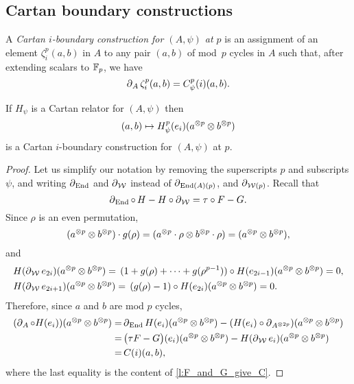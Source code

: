 \subsection{Cartan boundary constructions}\label{ss:cartan_coboundary}

A \textit{Cartan $i$-boundary construction for $(A,\psi)$ at $p$} is an assignment of an element $\zeta_i^p(a,b)$ in $A$ to any pair $(a,b)$ of mod~$p$ cycles in $A$ such that, after extending scalars to ${\mathbb{F}_p}$, we have
\[
\operatorname{\partial}_A \zeta_i^p(a,b) = C_\psi^p(i)(a, b).
\]

\begin{theorem}
	If $H_\psi$ is a Cartan relator for $(A, \psi)$ then
	\[
	(a,b) \mapsto H_\psi^p(e_i)(a^{\otimes p} \otimes b^{\otimes p})
	\]
	is a Cartan $i$-boundary construction for $(A, \psi)$ at $p$.
\end{theorem}

\begin{proof}
	Let us simplify our notation by removing the superscripts $p$ and subscripts $\psi$, and writing $\operatorname{\partial}_{\mathrm{End}}$ and $\operatorname{\partial}_{\mathcal{W}}$ instead of $\operatorname{\partial}_{\mathrm{End}(A)(p)}$, and $\operatorname{\partial}_{\mathcal{W}(p)}$.
	Recall that
	\[
	\operatorname{\partial}_{\mathrm{End}} \mathbin{\circ}\, H - H \mathbin{\circ} \operatorname{\partial}_{\mathcal{W}} = \tau \mathbin{\circ} F - G.
	\]
	Since $\rho$ is an even permutation,
	\[
	(a^{\otimes p} \otimes b^{\otimes p}) \cdot g(\rho) = (a^{\otimes p} \cdot \rho \otimes b^{\otimes p} \cdot \rho ) = (a^{\otimes p} \otimes b^{\otimes p}),
	\]
	and
	\begin{align*}
		&H(\operatorname{\partial}_{\mathcal{W}} e_{2i})(a^{\otimes p} \otimes b^{\otimes p}) =\,
		(1+g(\rho)+\dots+g(\rho^{p-1})) \mathbin{\circ} H(e_{2i-1})(a^{\otimes p} \otimes b^{\otimes p}) = 0, \\
		&H(\operatorname{\partial}_{\mathcal{W}} e_{2i+1})(a^{\otimes p} \otimes b^{\otimes p}) =\,
		(g(\rho) - 1) \mathbin{\circ} H(e_{2i})(a^{\otimes p} \otimes b^{\otimes p}) = 0.
	\end{align*}
	Therefore, since $a$ and $b$ are mod $p$ cycles,
	\begin{align*}
		(\operatorname{\partial}_A \mathbin{\circ} H(e_i))(a^{\otimes p} \otimes b^{\otimes p}) =&
		\operatorname{\partial}_{\mathrm{End}} H(e_i)(a^{\otimes p} \otimes b^{\otimes p}) - (H(e_i) \mathbin{\circ} \operatorname{\partial}_{A^{\otimes 2p}})(a^{\otimes p} \otimes b^{\otimes p}) \\ =& \,
		\big(\tau F - G\big)(e_i)(a^{\otimes p} \otimes b^{\otimes p}) -
		H(\operatorname{\partial}_{\mathcal{W}} e_i)(a^{\otimes p} \otimes b^{\otimes p}) \\ =&\,
		C(i)(a,b),
	\end{align*}
	where the last equality is the content of \cref{l:F_and_G_give_C}.
\end{proof}